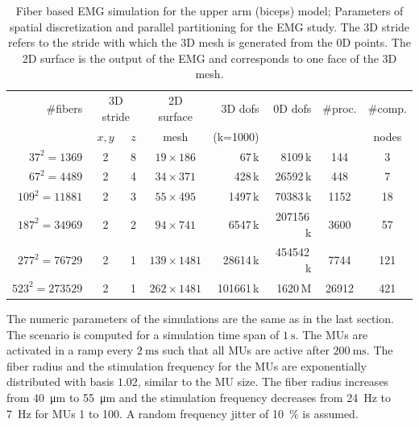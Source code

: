 \begin{table}
  \centering%
  \begin{tabular}{|r|c|c|c|r|r|c|c|}
    \hline
    \#fibers        & \multicolumn{2}{c|}{3D stride} & 2D surface  & 3D dofs    & 0D dofs & \#proc. & \#comp.\\
    \cline{2-3}
                         & $x,y$ & $z$                & mesh       & (k=1000)      &  && nodes\\
    \hline
    $37^2=\num{1369}$    & 2     & 8  & $19 \times 186$  & \num{67}\,k     & \num{8109}\,k  & \num{144} & 3\\[2mm]  %
    $67^2=\num{4489}$    & 2     & 4  & $34 \times 371$  & \num{428}\,k     & \num{26592}\,k  & \num{448} & 7\\[2mm]  %
    $109^2=\num{11881}$  & 2     & 3  & $55 \times 495$  & \num{1497}\,k     & \num{70383}\,k  & \num{1152} & 18\\[2mm]  %
    $187^2=\num{34969}$  & 2     & 2  & $94 \times 741$  & \num{6547}\,k     & \num{207156}\,k  & \num{3600} & 57\\[2mm] %
    $277^2=\num{76729}$  & 2     & 1  & $139 \times 1481$  & \num{28614}\,k  & \num{454542}\,k  & \num{7744} & 121\\[2mm] %
    $523^2=\num{273529}$ & 2     & 1  & $262 \times 1481$  & \num{101661}\,k  & \num{1620}\,M  & \num{26912} & 421\\ %
    \hline
  \end{tabular}
  \caption{Fiber based EMG simulation for the upper arm (biceps) model; Parameters of spatial discretization and parallel partitioning for the EMG study. The 3D stride refers to the stride with which the 3D mesh is generated from the 0D points. The 2D surface is the output of the EMG and corresponds to one face of the 3D mesh.}%
  \label{tab:emg_study_parameters}%
\end{table}

The numeric parameters of the simulations are the same as in the last section. The scenario is computed for a simulation time span of $\SI{1}{\s}$. The MUs are activated in a ramp every $\SI{2}{\ms}$ such that all MUs are active after $\SI{200}{\ms}$. The fiber radius
and the stimulation frequency for the MUs are exponentially distributed with basis $1.02$, similar to the MU size. The fiber radius increases from \SI{40}{\micro\meter} to \SI{55}{\micro\meter} and the stimulation frequency decreases from \SI{24}{\hertz} to \SI{7}{\hertz} for MUs 1 to 100. A random frequency jitter of \SI{10}{\percent} is assumed.

